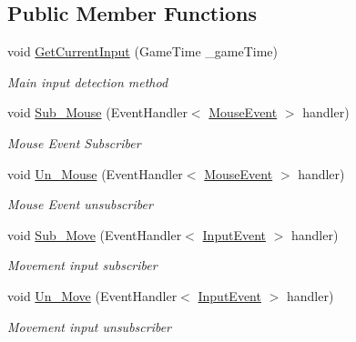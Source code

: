 \subsection*{Public Member Functions}
\begin{DoxyCompactItemize}
\item 
void \mbox{\hyperlink{class_g_m_t_b_1_1_input_system_1_1_input___manager_a19aece0b8405c55cd7c28df0a463899d}{Get\+Current\+Input}} (Game\+Time \+\_\+game\+Time)
\begin{DoxyCompactList}\small\item\em Main input detection method \end{DoxyCompactList}\item 
void \mbox{\hyperlink{class_g_m_t_b_1_1_input_system_1_1_input___manager_a44403aa4e08bb3e60e030689b8d178f6}{Sub\+\_\+\+Mouse}} (Event\+Handler$<$ \mbox{\hyperlink{class_g_m_t_b_1_1_input_system_1_1_mouse_event}{Mouse\+Event}} $>$ handler)
\begin{DoxyCompactList}\small\item\em Mouse Event Subscriber \end{DoxyCompactList}\item 
void \mbox{\hyperlink{class_g_m_t_b_1_1_input_system_1_1_input___manager_a7f3fda3da96c231d003ec39a4e884832}{Un\+\_\+\+Mouse}} (Event\+Handler$<$ \mbox{\hyperlink{class_g_m_t_b_1_1_input_system_1_1_mouse_event}{Mouse\+Event}} $>$ handler)
\begin{DoxyCompactList}\small\item\em Mouse Event unsubscriber \end{DoxyCompactList}\item 
void \mbox{\hyperlink{class_g_m_t_b_1_1_input_system_1_1_input___manager_aa5c3ef995d84d51c4c8d13853b6f18d1}{Sub\+\_\+\+Move}} (Event\+Handler$<$ \mbox{\hyperlink{class_g_m_t_b_1_1_input_system_1_1_input_event}{Input\+Event}} $>$ handler)
\begin{DoxyCompactList}\small\item\em Movement input subscriber \end{DoxyCompactList}\item 
void \mbox{\hyperlink{class_g_m_t_b_1_1_input_system_1_1_input___manager_a4ee9e098443b0a1299f3f0360d0fb3e6}{Un\+\_\+\+Move}} (Event\+Handler$<$ \mbox{\hyperlink{class_g_m_t_b_1_1_input_system_1_1_input_event}{Input\+Event}} $>$ handler)
\begin{DoxyCompactList}\small\item\em Movement input unsubscriber \end{DoxyCompactList}\item 

\end{DoxyCompactItemize}
